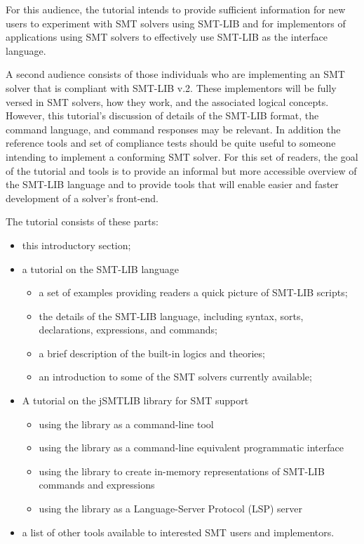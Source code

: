 \documentclass[12pt,oneside]{report}
\begin{document}
For this audience, the tutorial intends to provide sufficient information for new users to experiment with SMT solvers using SMT-LIB and for
implementors of applications using SMT solvers to effectively use SMT-LIB as the interface language.

A second audience consists of those individuals who are implementing an SMT solver that is compliant with SMT-LIB v.2.  These implementors will be fully versed in SMT solvers, how they work, and the associated logical concepts.  However, this tutorial's discussion of details of the SMT-LIB format, the command language, and command responses may be relevant.  In addition the reference tools and set of compliance tests should be quite useful to someone intending to implement a conforming SMT solver. For this set of readers, the goal of the tutorial and tools is to provide an informal but more accessible overview of the SMT-LIB language and to provide tools that will enable easier and faster development of a solver's front-end.

The tutorial consists of these parts:
\begin{itemize}
\item this introductory section;
\item a tutorial on the SMT-LIB language
\begin{itemize}
\item a set of examples providing readers a quick picture of SMT-LIB scripts;
\item the details of the SMT-LIB language, including syntax, sorts, declarations, expressions, and commands;
\item a brief description of the built-in logics and theories;
\item an introduction to some of the SMT solvers currently available;
\end{itemize}
\item A tutorial on the jSMTLIB library for SMT support
\begin{itemize}
\item using the library as a command-line tool
\item using the library as a command-line equivalent programmatic interface
\item using the library to create in-memory representations of SMT-LIB commands and expressions
\item using the library as a Language-Server Protocol (LSP) server
\end{itemize}
\item a list of other tools available to interested SMT users and implementors.
\end{itemize}
\end{document}
